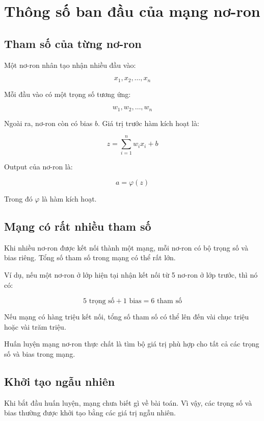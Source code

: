 \documentclass[12pt,a4paper]{report}
\begin{document}
\chapter{Thông số ban đầu của mạng nơ-ron}

\section{Tham số của từng nơ-ron}

Một nơ-ron nhân tạo nhận nhiều đầu vào:

\[
    x_1, x_2, \ldots, x_n
\]

Mỗi đầu vào có một trọng số tương ứng:

\[
    w_1, w_2, \ldots, w_n
\]

Ngoài ra, nơ-ron còn có bias $b$. Giá trị trước hàm kích hoạt là:

\[
    z = \sum_{i=1}^{n} w_i x_i + b
\]

Output của nơ-ron là:

\[
    a = \varphi(z)
\]

Trong đó $\varphi$ là hàm kích hoạt.

\section{Mạng có rất nhiều tham số}

Khi nhiều nơ-ron được kết nối thành một mạng, mỗi nơ-ron có bộ trọng số và bias riêng. Tổng số tham số trong mạng có thể rất lớn.

Ví dụ, nếu một nơ-ron ở lớp hiện tại nhận kết nối từ 5 nơ-ron ở lớp trước, thì nó có:

\[
    5 \text{ trọng số} + 1 \text{ bias} = 6 \text{ tham số}
\]

Nếu mạng có hàng triệu kết nối, tổng số tham số có thể lên đến vài chục triệu hoặc vài trăm triệu.

\begin{ghinho}
Huấn luyện mạng nơ-ron thực chất là tìm bộ giá trị phù hợp cho tất cả các trọng số và bias trong mạng.
\end{ghinho}

\section{Khởi tạo ngẫu nhiên}

Khi bắt đầu huấn luyện, mạng chưa biết gì về bài toán. Vì vậy, các trọng số và bias thường được khởi tạo bằng các giá trị ngẫu nhiên.
\end{document}
